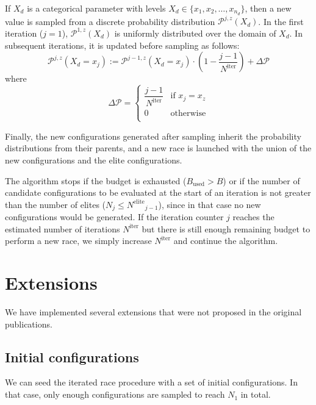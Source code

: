\documentclass[article,a4paper,nojss,notitle]{jss}
\newcommand{\assign}{\ensuremath{:=}}
\newcommand{\iter}{\ensuremath{j}\xspace}
\newcommand{\Budget}{\ensuremath{B}\xspace}
\newcommand{\Bused}{\ensuremath{\Budget_\text{used}}\xspace}
\newcommand{\Ncand}[1][]{\ensuremath{N_{#1}}\xspace}
\newcommand{\Niter}{\ensuremath{N^\text{iter}}\xspace}
\newcommand{\Nelite}{\ensuremath{N^\text{elite}}\xspace}
\newcommand{\parameter}[1]{\code{#1}}
\begin{document}
If $X_d$ is a categorical parameter with levels $X_d \in \{x_1, x_2,
\dotsc, x_{n_d} \}$, then a new value is sampled from a discrete
probability distribution $\mathcal{P}^{\iter,z}(X_d)$. In the first iteration ($\iter = 1$), $\mathcal{P}^{1,z}(X_d)$ is uniformly distributed over
the domain of $X_d$. In subsequent iterations, it is updated before
sampling as follows:
%
\begin{equation}\label{eq:prob_update}
  \mathcal{P}^{\iter,z} (X_d = x_j) \assign \mathcal{P}^{\iter-1,z} (X_d = x_j)
  \cdot \left(1 - \frac{\iter-1}{\Niter}\right) + \Delta \mathcal{P}
\end{equation}
where 
\begin{equation}\label{eq:2}
  \Delta \mathcal{P} = 
  \begin{cases}
    \dfrac{\iter - 1}{\Niter} & \text{if $x_j = x_z$}\\
    0  & \text{otherwise}\\
  \end{cases}
\end{equation}
%

Finally, the new configurations generated after sampling inherit the
probability distributions from their parents, and a new race is
launched with the union of the new configurations and the elite
configurations.

The algorithm stops if the budget is exhausted ($\Bused > \Budget$) or
if the number of candidate configurations to be evaluated at the start
of an iteration is not greater than the number of elites
($\Ncand[\iter] \leq \Nelite_{\iter-1}$), since in that case no new
configurations would be generated. If the iteration counter $\iter$
reaches the estimated number of iterations $\Niter$ but there is still
enough remaining budget to perform a new race, we simply increase
$\Niter$ and continue the algorithm.



\section{Extensions}\label{sec:extensions}

We have implemented several extensions that were not proposed in the
original publications.

\subsection{Initial configurations}

We can seed the iterated race procedure with a set of initial
configurations. In that case, only enough configurations are sampled
to reach $\Ncand[1]$ in total.
\end{document}
